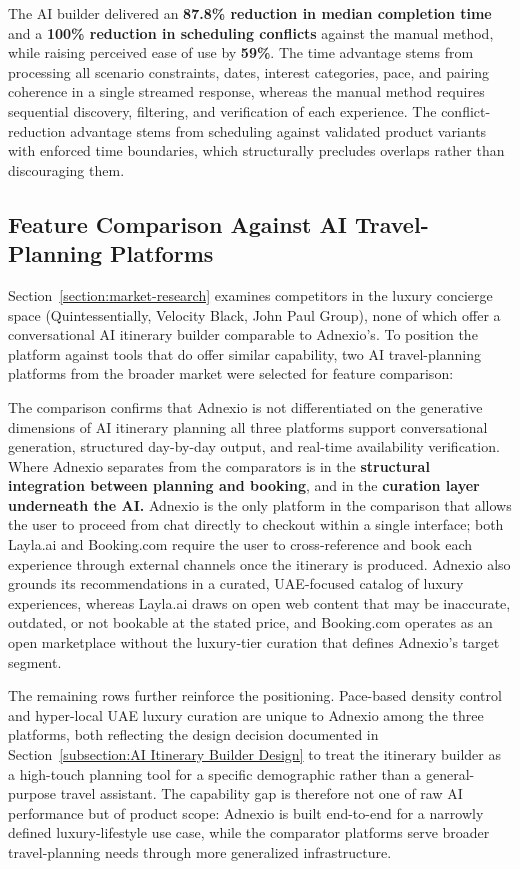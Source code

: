 The AI builder delivered an \textbf{87.8\% reduction in median completion time} and a \textbf{100\% reduction in scheduling conflicts} against the manual method, while raising perceived ease of use by \textbf{59\%}. The time advantage stems from processing all scenario constraints, dates, interest categories, pace, and pairing coherence in a single streamed response, whereas the manual method requires sequential discovery, filtering, and verification of each experience. The conflict-reduction advantage stems from scheduling against validated product variants with enforced time boundaries, which structurally precludes overlaps rather than discouraging them.

\subsection{Feature Comparison Against AI Travel-Planning Platforms}
\label{subsection:Feature Comparison Against AI Travel-Planning Platforms}
Section~\ref{section:market-research} examines competitors in the luxury concierge space (Quintessentially, Velocity Black, John Paul Group), none of which offer a conversational AI itinerary builder comparable to Adnexio's. To position the platform against tools that do offer similar capability, two AI travel-planning platforms from the broader market were selected for feature comparison: 


The comparison confirms that Adnexio is not differentiated on the generative dimensions of AI itinerary planning all three platforms support conversational generation, structured day-by-day output, and real-time availability verification. Where Adnexio separates from the comparators is in the \textbf{structural integration between planning and booking}, and in the \textbf{curation layer underneath the AI.} Adnexio is the only platform in the comparison that allows the user to proceed from chat directly to checkout within a single interface; both Layla.ai and Booking.com require the user to cross-reference and book each experience through external channels once the itinerary is produced. Adnexio also grounds its recommendations in a curated, UAE-focused catalog of luxury experiences, whereas Layla.ai draws on open web content that may be inaccurate, outdated, or not bookable at the stated price, and Booking.com operates as an open marketplace without the luxury-tier curation that defines Adnexio's target segment.

The remaining rows further reinforce the positioning. Pace-based density control and hyper-local UAE luxury curation are unique to Adnexio among the three platforms, both reflecting the design decision documented in Section~\ref{subsection:AI Itinerary Builder Design} to treat the itinerary builder as a high-touch planning tool for a specific demographic rather than a general-purpose travel assistant. The capability gap is therefore not one of raw AI performance but of product scope: Adnexio is built end-to-end for a narrowly defined luxury-lifestyle use case, while the comparator platforms serve broader travel-planning needs through more generalized infrastructure.
